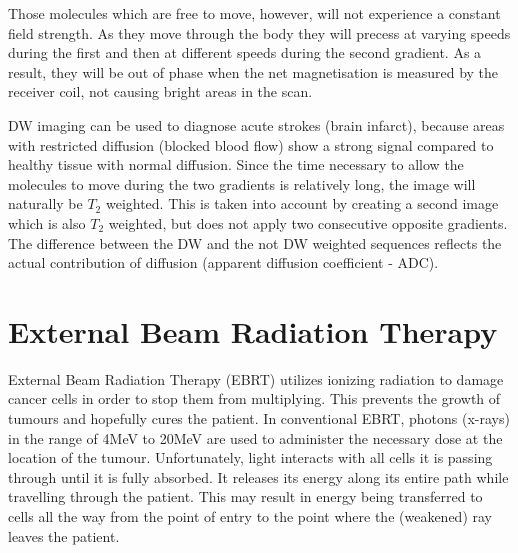 Those molecules which are free to move, however, will not experience a constant field strength.
As they move through the body they will precess at varying speeds during the first and then at different speeds during the second gradient.
As a result, they will be out of phase when the net magnetisation is measured by the receiver coil, not causing bright areas in the scan.

DW imaging can be used to diagnose acute strokes (brain infarct), because areas with restricted diffusion (blocked blood flow) show a strong signal compared to healthy tissue with normal diffusion.
Since the time necessary to allow the molecules to move during the two gradients is relatively long, the image will naturally be $T_2$ weighted.
This is taken into account by creating a second image which is also $T_2$ weighted, but does not apply two consecutive opposite gradients.
The difference between the DW and the not DW weighted sequences reflects the actual contribution of diffusion (apparent diffusion coefficient - ADC).




\section{External Beam Radiation Therapy}
\label{sec:planning}
External Beam Radiation Therapy (EBRT) utilizes ionizing radiation to damage cancer cells in order to stop them from multiplying.
This prevents the growth of tumours and hopefully cures the patient. 
In conventional EBRT, photons (x-rays) in the range of 4MeV to 20MeV are used to administer the necessary dose at the location of the tumour.
Unfortunately, light interacts with all cells it is passing through until it is fully absorbed.
It releases its energy along its entire path while travelling through the patient.
This may result in energy being transferred to cells all the way from the point of entry to the point where the (weakened) ray leaves the patient.

